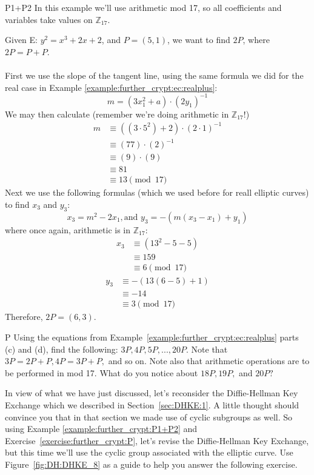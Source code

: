 \begin{example}{P1+P2} In this example we'll use arithmetic mod 17, so  all coefficients and variables take values on $\mathbb{Z}_{17}$.  

Given E: $y^2 = x^3 + 2x + 2$, and $P = (5,1)$,  we want to find $2P$, where $2P = P + P$.\\ \\
First we use the slope of the tangent line, using the same formula we did for the real case in Example \ref{example:further_crypt:ec:realplus}:	
\[m = (3x_1^2 + a) \cdot (2y_1)^{-1}\]	
We may then calculate (remember we're doing arithmetic in  $\mathbb{Z}_{17}$!)
\begin{align*}
		m &\equiv ( (3 \cdot 5^2) + 2) \cdot (2 \cdot 1)^{-1} \\
	          &\equiv  (77) \cdot (2)^{-1} \\
                     &\equiv (9) \cdot (9)\\
                     &\equiv 81 \\
                    &\equiv 13 \pmod{17}
		\end{align*}
Next we use the following formulas (which we used before for reall elliptic curves) to find $x_3$ and $y_3$: \[ x_3 = m^2 - 2x_1  , \text{and~} y_3 =-(  m(x_3 - x_1)+y_1)\]
where once again, arithmetic is in $\mathbb{Z}_{17}$:
\begin{align*}
		x_3 &\equiv  (13^2 - 5 - 5 ) \\
	          &\equiv 159\\
                     &\equiv 6 \pmod{17}
		\end{align*}
			\begin{align*}
		y_3 &\equiv - (13(6 - 5) +1) \\
	          &\equiv -14\\
                     &\equiv 3 \pmod{17}
		\end{align*}
Therefore, $2P = (6,3)$.
\end{example}
\begin{exercise}{P}
Using the equations from Example~\ref{example:further_crypt:ec:realplus} parts (c) and (d), find the following: $3P, 4P, 5P, ..., 20P.$  Note that $3P = 2P + P,  4P = 3P +P,$ and so on. Note also that arithmetic operations are to be performed in mod 17.  What do you notice about $18P,  19P,$ and $20P?$
\end{exercise}
In view of what we have just discussed, let's reconsider the Diffie-Hellman Key Exchange which we described in Section~\ref{sec:DHKE:1}. A little thought should convince you that in that section we made use of cyclic subgroups as well. So using Example \ref{example:further_crypt:P1+P2} and Exercise~\ref{exercise:further_crypt:P}, let's revise the Diffie-Hellman Key Exchange, but this time we'll use the cyclic group associated with the elliptic curve.  Use Figure~\ref{fig:DH:DHKE_8} as a guide to help you answer the following exercise.

